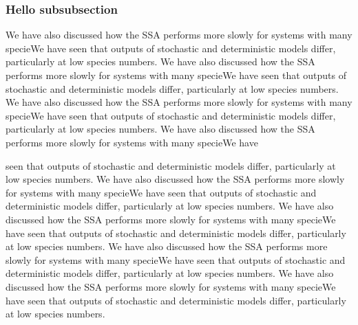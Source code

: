 \documentclass[11pt]{article}
\begin{document}
\begin{multicols}{2}
\subsubsection{Hello subsubsection}
We have also discussed how the SSA performs more slowly for systems
with many specieWe have seen that outputs of stochastic and
deterministic models differ, particularly at low species numbers. We
have also discussed how the SSA performs more slowly for systems with
many specieWe have seen that outputs of stochastic and deterministic
models differ, particularly at low species numbers. We have also
discussed how the SSA performs more slowly for systems with many
specieWe have seen that outputs of stochastic and deterministic models
differ, particularly at low species numbers. We have also discussed
how the SSA performs more slowly for systems with many specieWe have
\rule[-2ex]{0pt}{2ex}
seen that outputs of stochastic and deterministic models differ,
particularly at low species numbers. We have also discussed how the
SSA performs more slowly for systems with many specieWe have seen that
outputs of stochastic and deterministic models differ, particularly at
low species numbers. We have also discussed how the SSA performs more
slowly for systems with many specieWe have seen that outputs of
stochastic and deterministic models differ, particularly at low
species numbers. We have also discussed how the SSA performs more
slowly for systems with many specieWe have seen that outputs of
stochastic and deterministic models differ, particularly at low
species numbers. We have also discussed how the SSA performs more
slowly for systems with many specieWe have seen that outputs of
stochastic and deterministic models differ, particularly at low
species numbers.



\end{multicols}
\end{document}

